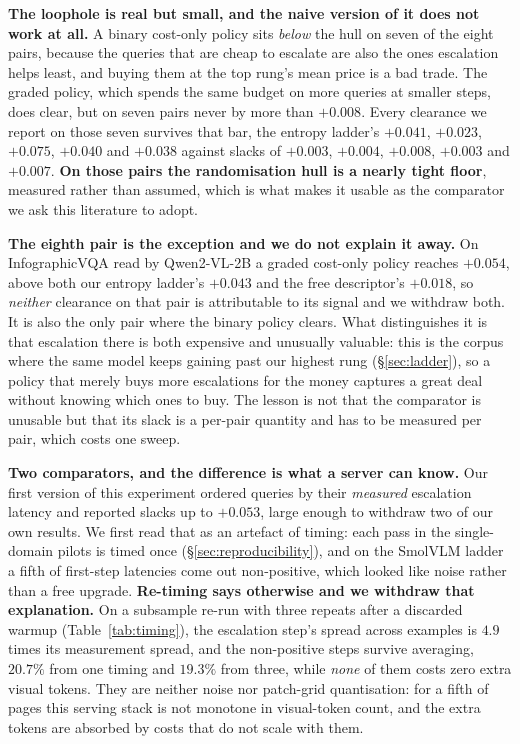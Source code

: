 \documentclass[10pt,twocolumn]{article}
\theoremstyle{plain}
\begin{document}
\textbf{The loophole is real but small, and the naive version of it does not
work at all.} A binary cost-only policy sits \emph{below} the hull on seven of
the eight pairs, because the queries that are cheap to escalate are also the
ones escalation helps least, and buying them at the top rung's mean price is a
bad trade. The graded policy, which spends the same budget on more queries at
smaller steps, does clear, but on seven pairs never by more than $+0.008$.
Every clearance we report on those seven survives that bar, the entropy
ladder's $+0.041$, $+0.023$, $+0.075$, $+0.040$ and $+0.038$ against slacks of
$+0.003$, $+0.004$, $+0.008$, $+0.003$ and $+0.007$. \textbf{On those pairs the
randomisation hull is a nearly tight floor}, measured rather than assumed,
which is what makes it usable as the comparator we ask this literature to
adopt.

\textbf{The eighth pair is the exception and we do not explain it away.} On
InfographicVQA read by Qwen2-VL-2B a graded cost-only policy reaches $+0.054$,
above both our entropy ladder's $+0.043$ and the free descriptor's $+0.018$, so
\emph{neither} clearance on that pair is attributable to its signal and we
withdraw both. It is also the only pair where the binary policy clears. What
distinguishes it is that escalation there is both expensive and unusually
valuable: this is the corpus where the same model keeps gaining past our
highest rung (\S\ref{sec:ladder}), so a policy that merely buys more
escalations for the money captures a great deal without knowing which ones to
buy. The lesson is not that the comparator is unusable but that its slack is a
per-pair quantity and has to be measured per pair, which costs one sweep.

\textbf{Two comparators, and the difference is what a server can know.} Our
first version of this experiment ordered queries by their \emph{measured}
escalation latency and reported slacks up to $+0.053$, large enough to withdraw
two of our own results. We first read that as an artefact of timing: each pass
in the single-domain pilots is timed once (\S\ref{sec:reproducibility}), and on
the SmolVLM ladder a fifth of first-step latencies come out non-positive, which
looked like noise rather than a free upgrade. \textbf{Re-timing says otherwise
and we withdraw that explanation.} On a subsample re-run with three repeats
after a discarded warmup (Table~\ref{tab:timing}), the escalation step's spread
across examples is $4.9$ times its measurement spread, and the non-positive
steps survive averaging, $20.7\%$ from one timing and $19.3\%$ from three,
while \emph{none} of them costs zero extra visual tokens. They are neither
noise nor patch-grid quantisation: for a fifth of pages this serving stack is
not monotone in visual-token count, and the extra tokens are absorbed by costs
that do not scale with them.
\end{document}
